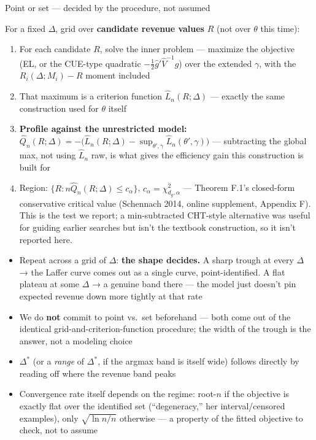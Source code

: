 \documentclass[
  ignorenonframetext,
  aspectratio=169,
]{beamer}
\providecommand{\tightlist}{%
  \setlength{\itemsep}{0pt}\setlength{\parskip}{0pt}}
\begin{document}
\begin{frame}{Point or set --- decided by the procedure, not assumed}
\protect{}\label{sec-counterfactual-inference}
\scriptsize

For a fixed \(\Delta\), grid over \textbf{candidate revenue values}
\(R\) (not over \(\theta\) this time):

\begin{enumerate}
\tightlist
\item
  For each candidate \(R\), solve the inner problem --- maximize the
  objective (EL, or the CUE-type quadratic
  \(-\tfrac12\hat g'\hat V^{-1}\hat g\)) over the extended \(\gamma\),
  with the \(R_i(\Delta;M_i)-R\) moment included
\item
  That maximum is a criterion function \(\hat L_n(R;\Delta)\) ---
  exactly the same construction used for \(\theta\) itself
\item
  \textbf{Profile against the unrestricted model:}
  \(\hat Q_n(R;\Delta)=-\big(\hat L_n(R;\Delta)-\sup_{\theta',\gamma}\hat L_n(\theta',\gamma)\big)\)
  --- subtracting the global max, not using \(\hat L_n\) raw, is what
  gives the efficiency gain this construction is built for
\item
  Region: \(\{R:n\hat Q_n(R;\Delta)\le c_\alpha\}\),
  \(c_\alpha=\chi^2_{d_g,\alpha}\) --- Theorem F.1's closed-form
  conservative critical value (Schennach 2014, online supplement,
  Appendix F). This is the test we report; a min-subtracted CHT-style
  alternative was useful for guiding earlier searches but isn't the
  textbook construction, so it isn't reported here.
\end{enumerate}

\begin{itemize}
\tightlist
\item
  Repeat across a grid of \(\Delta\): \textbf{the shape decides.} A
  sharp trough at every \(\Delta\) → the Laffer curve comes out as a
  single curve, point-identified. A flat plateau at some \(\Delta\) → a
  genuine band there --- the model just doesn't pin expected revenue
  down more tightly at that rate
\item
  We do \textbf{not} commit to point vs.~set beforehand --- both come
  out of the identical grid-and-criterion-function procedure; the width
  of the trough is the answer, not a modeling choice
\item
  \(\Delta^*\) (or a \emph{range} of \(\Delta^*\), if the argmax band is
  itself wide) follows directly by reading off where the revenue band
  peaks
\item
  Convergence rate itself depends on the regime: root-\(n\) if the
  objective is exactly flat over the identified set (``degeneracy,'' her
  interval/censored examples), only \(\sqrt{\ln n/n}\) otherwise --- a
  property of the fitted objective to check, not to assume
\end{itemize}
\end{frame}
\end{document}
